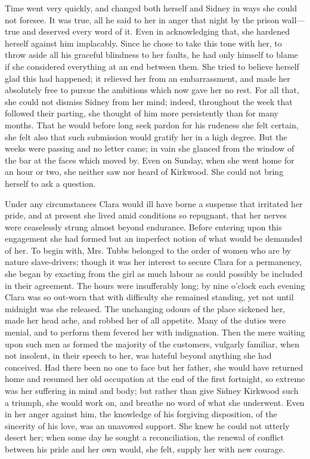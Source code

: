 Time went very quickly, and changed both herself and Sidney in ways she
could not foresee. It was true, all he said to her in anger that night
by the prison wall---true and deserved every word of it. Even in
acknowledging that, she hardened herself against him implacably. Since
he chose to take this tone with her, to throw aside all his graceful
blindness to her faults, he had only himself to {}blame if she
considered everything at an end between them. She tried to believe
herself glad this had happened; it relieved her from an embarrassment,
and made her absolutely free to pursue the ambitions which now gave her
no rest. For all that, she could not dismiss Sidney from her mind;
indeed, throughout the week that followed their parting, she thought of
him more persistently than for many months. That he would before long
seek pardon for his rudeness she felt certain, she felt also that such
submission would gratify her in a high degree. But the weeks were
passing and no letter came; in vain she glanced from the window of the
bar at the faces which moved by. Even on Sunday, when she went home for
an hour or two, she neither saw nor heard of Kirkwood. She could not
bring herself to ask a question.

Under any circumstances Clara would ill have borne a suspense that
irritated her pride, and at present she lived amid conditions so
repugnant, that her nerves were ceaselessly strung almost beyond
endurance. Before {}entering upon this engagement she had formed but an
imperfect notion of what would be demanded of her. To begin with, Mrs.
Tubbs belonged to the order of women who are by nature slave-drivers;
though it was her interest to secure Clara for a permanency, she began
by exacting from the girl as much labour as could possibly be included
in their agreement. The hours were insufferably long; by nine o'clock
each evening Clara was so out-worn that with difficulty she remained
standing, yet not until midnight was she released. The unchanging odours
of the place sickened her, made her head ache, and robbed her of all
appetite. Many of the duties were menial, and to perform them fevered
her with indignation. Then the mere waiting upon such men as formed the
majority of the customers, vulgarly familiar, when not insolent, in
their speech to her, was hateful beyond anything she had conceived. Had
there been no one to face but her father, she would have returned home
and resumed her old occupation at the end of the first fortnight, so
extreme {}was her suffering in mind and body; but rather than give
Sidney Kirkwood such a triumph, she would work on, and breathe no word
of what she underwent. Even in her anger against him, the knowledge of
his forgiving disposition, of the sincerity of his love, was an unavowed
support. She knew he could not utterly desert her; when some day he
sought a reconciliation, the renewal of conflict between his pride and
her own would, she felt, supply her with new courage.

